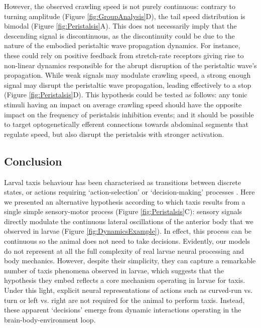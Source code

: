 \documentclass[11pt,a4paper]{article}
\newcommand{\todoKL}[1]{\todo[author=KL,color=blue!40, size=\tiny,inline]{#1}}
\newcommand{\todoBW}[1]{\todo[author=BW,color=orange, size=\tiny,inline]{#1}}
\begin{document}
However, the observed crawling speed is not purely continuous: contrary to turning amplitude (Figure \ref{fig:GroupAnalysis}D), the tail speed distribution is bimodal (Figure \ref{fig:Peristalsis}A).
 This does not necessarily imply that the descending signal is discontinuous, as the discontinuity could be due to the nature of the embodied peristaltic wave propagation dynamics. For instance, these could rely on positive feedback from stretch-rate receptors \citep{ross2015model} giving rise to non-linear dynamics responsible for the abrupt disruption of the peristaltic wave's propagation. While weak signals may modulate crawling speed, a strong enough signal may disrupt the peristaltic wave propagation, leading effectively to a stop (Figure \ref{fig:Peristalsis}D).
  This hypothesis could be tested as follows: any tonic stimuli having an impact on average crawling speed should have the opposite impact on the frequency of peristalsis inhibition events; and it should be possible to target optogenetically efferent connections towards abdominal segments that regulate speed, but also disrupt the peristalsis with stronger activation.

\subsection{Conclusion}
Larval taxis behaviour has been characterised as transitions between discrete states, or actions \citep{green1983organization,sawin1994sensorimotor, cobbwhatandhow1999, gomez2012active}  requiring ‘action-selection’ or ‘decision-making’ processes \citep{gomez2014multilevel}.
 Here we presented an alternative hypothesis according to which taxis results from a single simple sensory-motor process (Figure \ref{fig:Peristalsis}C): sensory signals directly modulate the continuous lateral oscillations of the anterior body that we observed in larvae (Figure \ref{fig:DynamicsExample}).
 In effect, this process can be continuous so the animal does not need to take decisions. 
Evidently, our models do not represent at all the full complexity of real larvae neural processing and body mechanics. However, despite their simplicity, they can capture a remarkable number of taxis phenomena observed in larvae, which suggests that the hypothesis they embed reflects a core mechanism operating in larvae for taxis. Under this light, explicit neural representations of actions such as curved-run vs. turn or left vs. right are not required for the animal to perform taxis. Instead, these apparent `decisions' emerge from dynamic interactions operating in the brain-body-environment loop.
\end{document}
